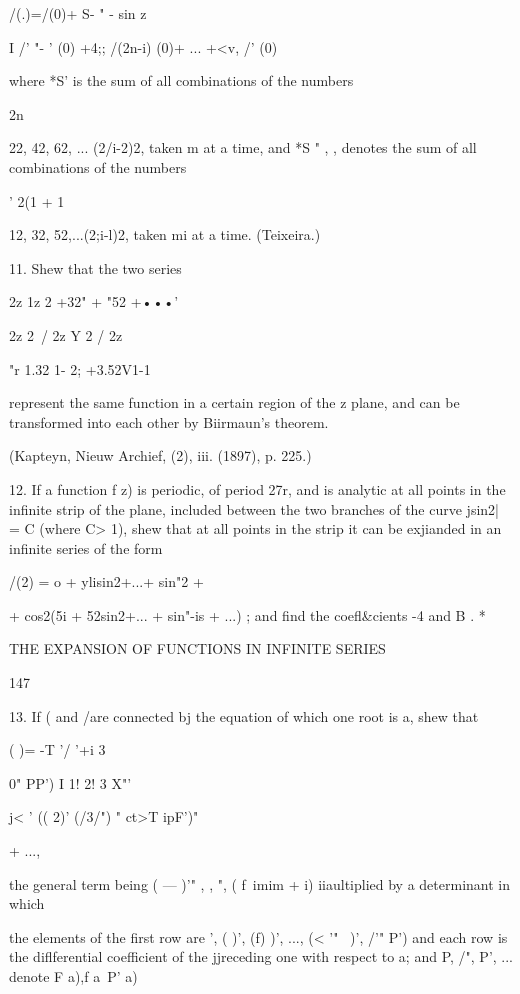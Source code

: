 {{/(.)=/(0)+ S- " - sin z

I /' "- ' (0) +4;; /(2n-i) (0)+ ... +<v, /' (0)

where *S' is the sum of all combinations of the numbers

2n

22, 42, 62, ... (2/i-2)2, taken m at a time, and *S " , , denotes the
sum of all combinations of the numbers

' 2(1 + 1

12, 32, 52,...(2;i-l)2, taken mi at a time. (Teixeira.)

11. Shew that the two series

2z 1z 2 +32" + "52 +•••'

2z 2\ / 2z Y 2 / 2z

 "r 1.32 1- 2; +3.52V1-1

represent the same function in a certain region of the z plane, and
can be transformed into each other by Biirmaun's theorem.

(Kapteyn, Nieuw Archief, (2), iii. (1897), p. 225.)

12. If a function f z) is periodic, of period 27r, and is analytic at
all points in the infinite strip of the plane, included between the
two branches of the curve jsin2| = C (where C> 1), shew that at all
points in the strip it can be exjianded in an infinite series of the
form

/(2) = o + ylisin2+...+ sin"2 +

+ cos2(5i + 52sin2+... + sin"-is + ...) ; and find the coefl\&cients
-4 and B . *



THE EXPANSION OF FUNCTIONS IN INFINITE SERIES



147



13. If ( and /are connected bj the equation of which one root is a,
shew that



 ( )= -T '/ '+i 3



0" PP') I 1! 2! 3 X"'



j< ' (( 2)' (/3/") " ct>T ipF')"



+ ...,



the general term being ( — )'" , , ", ( f\ imim + i) iiaultiplied by a
determinant in which

the elements of the first row are ', ( )', (f) )', ..., (< '"~ )', /'"
P') and each row is the diflferential coefficient of the jjreceding
one with respect to a; and P, /", P', ... denote F a),f a\ P' a)

}}
